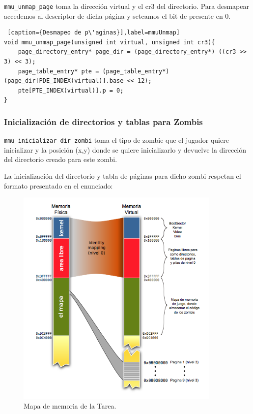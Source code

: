 \par \texttt{mmu_unmap_page} toma la direcci\'on virtual y el cr3 del directorio. Para desmapear accedemos al descriptor de dicha p\'agina y seteamos el bit de presente en 0.

\begin{lstlisting} [caption={Desmapeo de p\'aginas}],label=mmuUnmap] 
void mmu_unmap_page(unsigned int virtual, unsigned int cr3){
	page_directory_entry* page_dir = (page_directory_entry*) ((cr3 >> 3) << 3);
	page_table_entry* pte = (page_table_entry*) (page_dir[PDE_INDEX(virtual)].base << 12);
	pte[PTE_INDEX(virtual)].p = 0;
}
\end{lstlisting}

\newpage
\subsubsection*{Inicialización de directorios y tablas para Zombis}

\par \texttt{mmu_inicializar_dir_zombi} toma el tipo de zombie que el jugador quiere inicializar y la posici\'on (x,y) donde se quiere inicializarlo y devuelve la direcci\'on del directorio creado para este zombi.

\par La inicializaci\'on del directorio y tabla de p\'aginas para dicho zombi respetan el formato presentado en el enunciado:

\begin{figure}[ht!]
\centering
\includegraphics[width=100mm]{imagenes/memoriatarea.png}
\caption{Mapa de memoria de la Tarea.}
\end{figure}

